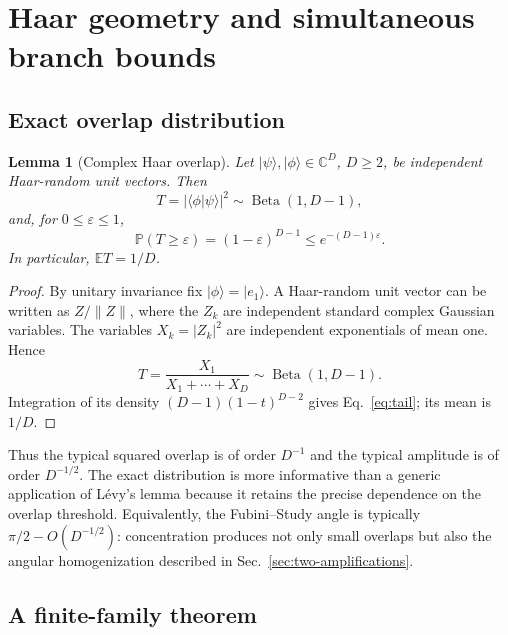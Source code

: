 \documentclass[aps,pra,reprint,superscriptaddress,nofootinbib,longbibliography]{revtex4-2}
\newtheorem{lemma}{Lemma}
\newcommand{\ket}[1]{| #1 \rangle}
\newcommand{\eps}{\varepsilon}
\newcommand{\E}{\mathbb{E}}
\newcommand{\PP}{\mathbb{P}}
\begin{document}
\section{Haar geometry and simultaneous branch bounds}
\label{sec:haar}

\subsection{Exact overlap distribution}

\begin{lemma}[Complex Haar overlap]
\label{lem:haar-overlap}
Let $\ket{\psi},\ket{\phi}\in\mathbb C^D$, $D\geq2$, be independent
Haar-random unit vectors.  Then
\begin{equation}
 T=|\langle\phi|\psi\rangle|^2
 \sim\operatorname{Beta}(1,D-1),
 \label{eq:beta}
\end{equation}
and, for $0\leq\eps\leq1$,
\begin{equation}
 \PP(T\geq\eps)=(1-\eps)^{D-1}
 \leq e^{-(D-1)\eps}.
 \label{eq:tail}
\end{equation}
In particular, $\E T=1/D$.
\end{lemma}

\begin{proof}
By unitary invariance fix $\ket{\phi}=\ket{e_1}$.  A Haar-random unit
vector can be written as $Z/\|Z\|$, where the $Z_k$ are independent standard
complex Gaussian variables.  The variables $X_k=|Z_k|^2$ are independent
exponentials of mean one.  Hence
\begin{equation}
 T=\frac{X_1}{X_1+\cdots+X_D}
 \sim\operatorname{Beta}(1,D-1).
\end{equation}
Integration of its density $(D-1)(1-t)^{D-2}$ gives
Eq.~\eqref{eq:tail}; its mean is $1/D$.
\end{proof}

Thus the typical squared overlap is of order $D^{-1}$ and the typical
amplitude is of order $D^{-1/2}$.  The exact distribution is more informative
than a generic application of L\'evy's lemma because it retains the precise
dependence on the overlap threshold.  Equivalently, the Fubini--Study angle
is typically $\pi/2-O(D^{-1/2})$: concentration produces not only small
overlaps but also the angular homogenization described in
Sec.~\ref{sec:two-amplifications}.

\subsection{A finite-family theorem}
\end{document}
